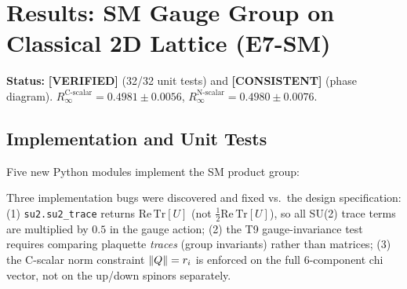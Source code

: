 \documentclass[12pt,a4paper]{article}
\newcommand{\verified}{\textcolor{green!55!black}{\textbf{[VERIFIED]}}}
\newcommand{\consistent}{\textcolor{blue!70!black}{\textbf{[CONSISTENT]}}}
\theoremstyle{plain}
\theoremstyle{definition}
\theoremstyle{remark}
\begin{document}
\section{Results: SM Gauge Group on Classical 2D Lattice (E7-SM)}
\label{sec:sm}

\begin{statusbox}
\textbf{Status:} \verified{} (32/32 unit tests) and \consistent{} (phase diagram).
$R_\infty^\text{C-scalar}=0.4981 \pm 0.0056$, $R_\infty^\text{N-scalar}=0.4980 \pm 0.0076$.
\end{statusbox}

\subsection{Implementation and Unit Tests}

Five new Python modules implement the SM product group:

\begin{table}[ht]
\centering
\caption{SM simulation modules and their unit test results.}
\label{tab:sm_modules}
\end{table}

Three implementation bugs were discovered and fixed vs.\ the design specification:
(1) \texttt{su2.su2\_trace} returns $\mathrm{Re}\,\mathrm{Tr}[U]$ (not
$\frac{1}{2}\mathrm{Re}\,\mathrm{Tr}[U]$), so all SU(2) trace terms are multiplied by
$0.5$ in the gauge action;
(2) the T9 gauge-invariance test requires comparing plaquette \emph{traces} (group
invariants) rather than matrices;
(3) the C-scalar norm constraint $\norm{Q}=r_i$ is enforced on the full 6-component
chi vector, not on the up/down spinors separately.
\end{document}
